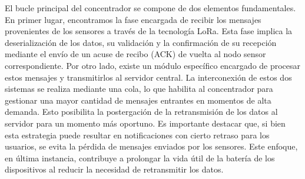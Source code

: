 El bucle principal del concentrador se compone de dos elementos fundamentales. En primer lugar, encontramos la fase encargada de recibir los mensajes provenientes de los sensores a través de la tecnología LoRa. Esta fase implica la deserialización de los datos, su validación y la confirmación de su recepción mediante el envío de un acuse de recibo (ACK) de vuelta al nodo sensor correspondiente. Por otro lado, existe un módulo específico encargado de procesar estos mensajes y transmitirlos al servidor central.
La interconexión de estos dos sistemas se realiza mediante una cola, lo que habilita al concentrador para gestionar una mayor cantidad de mensajes entrantes en momentos de alta demanda. Esto posibilita la postergación de la retransmisión de los datos al servidor para un momento más oportuno. Es importante destacar que, si bien esta estrategia puede resultar en notificaciones con cierto retraso para los usuarios, se evita la pérdida de mensajes enviados por los sensores. Este enfoque, en última instancia, contribuye a prolongar la vida útil de la batería de los dispositivos al reducir la necesidad de retransmitir los datos.

